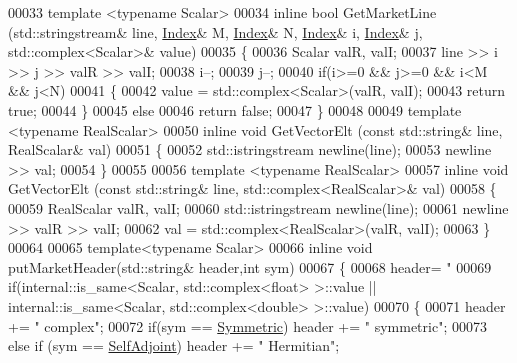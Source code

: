 \begin{DoxyCode}
00033   \textcolor{keyword}{template} <\textcolor{keyword}{typename} Scalar>
00034   \textcolor{keyword}{inline} \textcolor{keywordtype}{bool} GetMarketLine (std::stringstream& line, \hyperlink{namespace_eigen_a62e77e0933482dafde8fe197d9a2cfde}{Index}& M, \hyperlink{namespace_eigen_a62e77e0933482dafde8fe197d9a2cfde}{Index}& N, 
      \hyperlink{namespace_eigen_a62e77e0933482dafde8fe197d9a2cfde}{Index}& i, \hyperlink{namespace_eigen_a62e77e0933482dafde8fe197d9a2cfde}{Index}& j, std::complex<Scalar>& value)
00035   \{
00036     Scalar valR, valI;
00037     line >> i >> j >> valR >> valI;
00038     i--;
00039     j--;
00040     \textcolor{keywordflow}{if}(i>=0 && j>=0 && i<M && j<N)
00041     \{
00042       value = std::complex<Scalar>(valR, valI);
00043       \textcolor{keywordflow}{return} \textcolor{keyword}{true}; 
00044     \}
00045     \textcolor{keywordflow}{else}
00046       \textcolor{keywordflow}{return} \textcolor{keyword}{false};
00047   \}
00048 
00049   \textcolor{keyword}{template} <\textcolor{keyword}{typename} RealScalar>
00050   \textcolor{keyword}{inline} \textcolor{keywordtype}{void}  GetVectorElt (\textcolor{keyword}{const} std::string& line, RealScalar& val)
00051   \{
00052     std::istringstream newline(line);
00053     newline >> val;  
00054   \}
00055 
00056   \textcolor{keyword}{template} <\textcolor{keyword}{typename} RealScalar>
00057   \textcolor{keyword}{inline} \textcolor{keywordtype}{void} GetVectorElt (\textcolor{keyword}{const} std::string& line, std::complex<RealScalar>& val)
00058   \{
00059     RealScalar valR, valI; 
00060     std::istringstream newline(line);
00061     newline >> valR >> valI; 
00062     val = std::complex<RealScalar>(valR, valI);
00063   \}
00064   
00065   \textcolor{keyword}{template}<\textcolor{keyword}{typename} Scalar>
00066   \textcolor{keyword}{inline} \textcolor{keywordtype}{void} putMarketHeader(std::string& header,\textcolor{keywordtype}{int} sym)
00067   \{
00068     header= \textcolor{stringliteral}{"%
00069     \textcolor{keywordflow}{if}(internal::is\_same<Scalar, std::complex<float> >::value || internal::is\_same<Scalar, 
      std::complex<double> >::value)
00070     \{
00071       header += \textcolor{stringliteral}{" complex"}; 
00072       \textcolor{keywordflow}{if}(sym == \hyperlink{group__enums_gga39e3366ff5554d731e7dc8bb642f83cda7d30fb969ef6b763c098f0015108cef4}{Symmetric}) header += \textcolor{stringliteral}{" symmetric"};
00073       \textcolor{keywordflow}{else} \textcolor{keywordflow}{if} (sym == \hyperlink{group__enums_gga39e3366ff5554d731e7dc8bb642f83cda2491fc6765056421f504eb7e16083e8f}{SelfAdjoint}) header += \textcolor{stringliteral}{" Hermitian"};
}
\end{DoxyCode}
